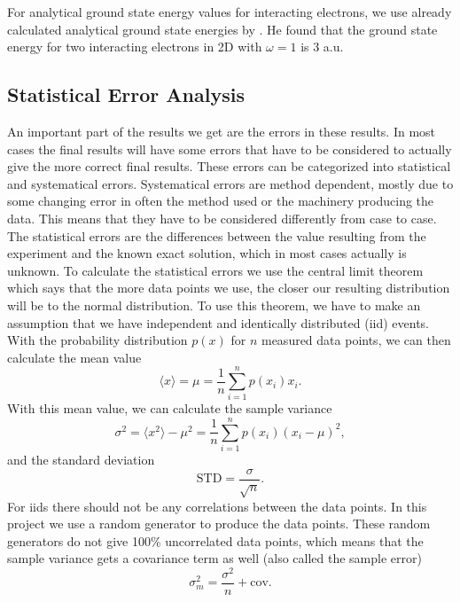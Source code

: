 \documentclass[12pt,a4paper,english]{article}
\begin{document}
For analytical ground state energy values for interacting electrons, we use already calculated analytical ground state energies by \citet{taut1993two}. He found that the ground state energy for two interacting electrons in 2D with $\omega=1$ is 3 a.u.

\subsection{Statistical Error Analysis}
\label{subsect:Error_analysis}
An important part of the results we get are the errors in these results. In most cases the final results will have some errors that have to be considered to actually give the more correct final results. These errors can be categorized into statistical and systematical errors. Systematical errors are method dependent, mostly due to some changing error in often the method used or the machinery producing the data. This means that they have to be considered differently from case to case. The statistical errors are the differences between the value resulting from the experiment and the known exact solution, which in most cases actually is unknown. To calculate the statistical errors we use the central limit theorem which says that the more data points we use, the closer our resulting distribution will be to the normal distribution. To use this theorem, we have to make an assumption that we have independent and identically distributed (iid) events. With the probability distribution $p(x)$ for $n$ measured data points, we can then calculate the mean value
\begin{equation}
\label{eq:stat_mean}
\langle x \rangle =\mu=\frac{1}{n}\sum_{i=1}^{n}p(x_i)x_i.
\end{equation}
With this mean value, we can calculate the sample variance 
\begin{equation}
\label{eq:stat_ar}
\sigma^2=\langle x^2 \rangle-\mu^2=\frac{1}{n}\sum_{i=1}^{n}p(x_i)(x_i-\mu)^2,
\end{equation}
and the standard deviation
\begin{equation}
\label{eq:stat_STD}
\text{STD}=\frac{\sigma}{\sqrt{n}}.
\end{equation}
For iids there should not be any correlations between the data points. In this project we use a random generator to produce the data points. These random generators do not give 100\% uncorrelated data points, which means that the sample variance gets a covariance term as well (also called the sample error)
\begin{equation}
\label{eq:stat_var_cov}
\sigma_m^2=\frac{\sigma^2}{n}+\text{cov}.
\end{equation}
\end{document}
